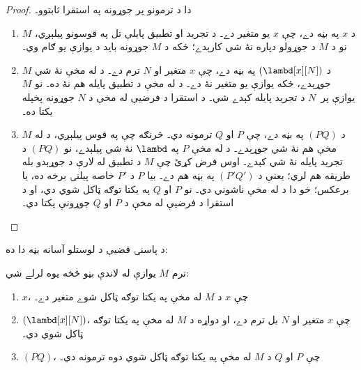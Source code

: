 \documentclass[../../../include/open-logic-section]{subfiles}
\begin{document}
\begin{proof}
  دا د ترمونو پر جوړونه په استقرا ثابتوو۔
  \begin{enumerate}
    \item $M$ د $x$ په بڼه دے، چې $x$ يو متغير دے۔ د تجريد او
      تطبيق پايلې تل په قوسونو پيلېږي، نو د $M$ د جوړولو دپاره نۀ شي
      کارېدے؛ ځکه د $M$ جوړونه بايد د
       يوازې يو ګام
      وي۔
    \item $M$ د $(\lambd[x][N])$ په بڼه دے، چې $x$ متغير او $N$
      ترم دے۔ د 
      له مخې نۀ شي جوړېدے، ځکه يوازې يو متغير نۀ دے۔ د
       له مخې د تطبيق پايله هم نۀ ده۔ نو $M$
      يوازې پر~$N$ د تجريد پايله کېدے شي۔ د استقرا د فرضيې له مخې
      د $N$ جوړونه پخپله يکتا ده۔
    \item $M$ د $(PQ)$ په بڼه دے، چې $P$ او $Q$ ترمونه دي۔ څرنګه
      چې په قوس پيلېږي، د
       له مخې هم
      نۀ شي جوړېدے۔ د  له مخې $P$ په
      $\lambd$ نۀ شي پيلېدے، نو $(PQ)$ د تجريد پايله نۀ شي کېدے۔
      اوس فرض کړئ چې $M$ د تطبيق له لارې د جوړېدو بله طريقه هم لري؛
      يعنې د $(P'Q')$ په بڼه هم دے۔ بيا $P$ د $P'$ خاصه پيلنۍ برخه
      ده، يا برعکس؛ خو دا د  له مخې ناشوني دي۔
      نو $P$ او $Q$ په يکتا توګه ټاکل شوي دي، او د استقرا د فرضيې
      له مخې د $P$ او $Q$ جوړونې يکتا دي۔
  \end{enumerate}
\end{proof}

د پاسنۍ قضيې د لوستلو آسانه بڼه دا ده:
\begin{prop}
  ترم $M$ يوازې له لاندې بڼو څخه يوه لرلے شي:
  \begin{enumerate}
    \item $x$، چې $x$ د $M$ له مخې په يکتا توګه ټاکل شوے متغير دے۔
    \item $(\lambd[x][N])$، چې $x$ متغير او $N$ بل ترم دے، او
      دواړه د $M$ له مخې په يکتا توګه ټاکل شوي دي۔
    \item $(PQ)$، چې $P$ او $Q$ د $M$ له مخې په يکتا توګه ټاکل شوي
      دوه ترمونه دي۔
  \end{enumerate}
\end{prop}
\end{document}
